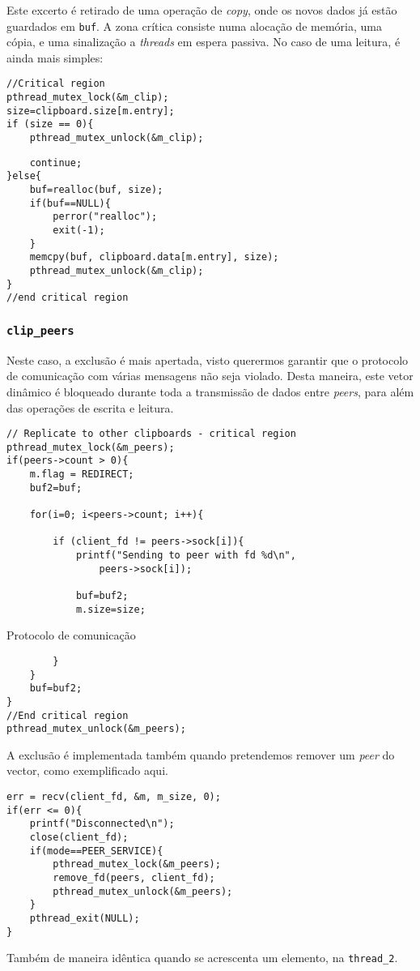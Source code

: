 \documentclass{article}
\begin{document}
Este excerto é retirado de uma operação de \textit{copy}, onde os novos dados já estão guardados em \texttt{buf}. A zona crítica consiste numa alocação de memória, uma cópia, e uma sinalização a \textit{threads} em espera passiva. No caso de uma leitura, é ainda mais simples:

\begin{verbatim}
//Critical region
pthread_mutex_lock(&m_clip);
size=clipboard.size[m.entry];
if (size == 0){
	pthread_mutex_unlock(&m_clip);
\end{verbatim}
\begin{verbatim}
	continue;
}else{
	buf=realloc(buf, size);
	if(buf==NULL){
		perror("realloc");
		exit(-1);
	}
	memcpy(buf, clipboard.data[m.entry], size);		
	pthread_mutex_unlock(&m_clip);
}
//end critical region
\end{verbatim}

\subsubsection{\texttt{clip\_peers}}

Neste caso, a exclusão é mais apertada, visto querermos garantir que o protocolo de comunicação com várias mensagens não seja violado. Desta maneira, este vetor dinâmico é bloqueado durante toda a transmissão de dados entre \textit{peers}, para além das operações de escrita e leitura.
\begin{verbatim}
// Replicate to other clipboards - critical region
pthread_mutex_lock(&m_peers);
if(peers->count > 0){
	m.flag = REDIRECT;
	buf2=buf;
				
	for(i=0; i<peers->count; i++){
					
		if (client_fd != peers->sock[i]){
			printf("Sending to peer with fd %d\n", 
				peers->sock[i]);
						
			buf=buf2;
			m.size=size;
\end{verbatim}
Protocolo de comunicação
\begin{verbatim}
		}
	}
	buf=buf2;
}
//End critical region
pthread_mutex_unlock(&m_peers);
\end{verbatim}

A exclusão é implementada também quando pretendemos remover um \textit{peer} do vector, como exemplificado aqui.
\begin{verbatim}
err = recv(client_fd, &m, m_size, 0);
if(err <= 0){
	printf("Disconnected\n");
	close(client_fd);
	if(mode==PEER_SERVICE){
		pthread_mutex_lock(&m_peers);
		remove_fd(peers, client_fd);
		pthread_mutex_unlock(&m_peers);
	}
	pthread_exit(NULL);
}
\end{verbatim}
Também de maneira idêntica quando se acrescenta um elemento, na \texttt{thread\_2}.
\end{document}
